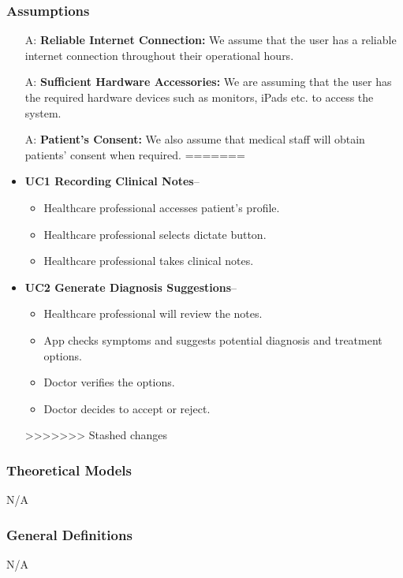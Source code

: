 \documentclass[12pt]{article}
\newcounter{assumpnum} %
\begin{document}
\subsubsection{Assumptions} \label{sec_assumpt}

\begin{itemize}
<<<<<<< Updated upstream
  \item[A\refstepcounter{assumpnum}\theassumpnum \label{A_reliableInternet}:] \textbf{Reliable Internet Connection:} We assume that the user has a reliable internet connection throughout their operational hours.
  \item[A\refstepcounter{assumpnum}\theassumpnum \label{A_sufficientHardware}:] \textbf{Sufficient Hardware Accessories:} We are assuming that the user has the required hardware devices such as monitors, iPads etc. to access the system.
  \item[A\refstepcounter{assumpnum}\theassumpnum \label{A_patientConsent}:] \textbf{Patient’s Consent:} We also assume that medical staff will obtain patients’ consent when required.  
=======
  \item\textbf{UC1 Recording Clinical Notes}--
  \begin{itemize}
    \item{Healthcare professional accesses patient’s profile.}
    \item{Healthcare professional selects dictate button.}
    \item{Healthcare professional takes clinical notes.}
  \end{itemize}
  \item\textbf{UC2 Generate Diagnosis Suggestions}--
  \begin{itemize}
    \item{Healthcare professional will review the notes.}
    \item{App checks symptoms and suggests potential diagnosis and treatment options.}
    \item{Doctor verifies the options.}
    \item{Doctor decides to accept or reject.}
  \end{itemize}
>>>>>>> Stashed changes
\end{itemize}


\subsubsection{Theoretical Models}\label{sec_theoretical}
N/A

\subsubsection{General Definitions} \label{sec_GeneralDefinitions}
N/A
\end{document}
